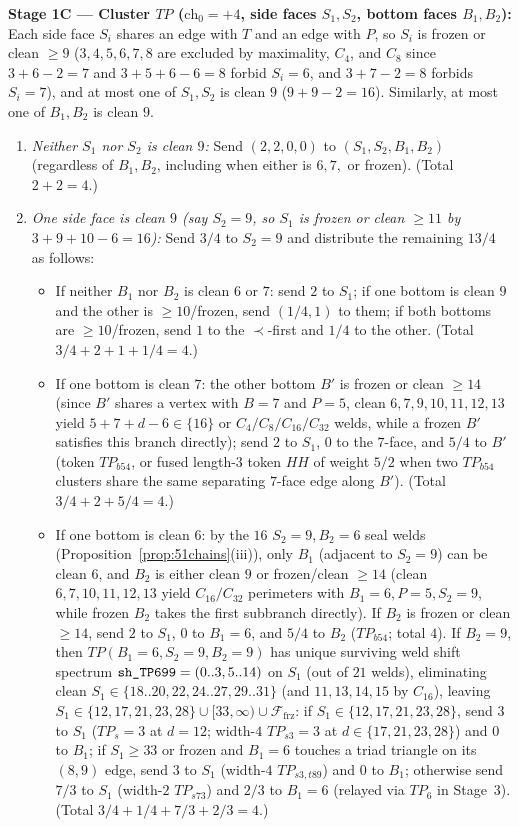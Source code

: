 \documentclass[11pt,reqno]{amsart}
\theoremstyle{plain}
\theoremstyle{definition}
\theoremstyle{remark}
\newcommand{\chz}{\mathrm{ch}_0}
\newcommand{\Ffrz}{\mathcal{F}_{\mathrm{frz}}}
\DeclareRobustCommand{\_}{\ifmmode\text{\textunderscore}\else\textunderscore\allowbreak\fi}
\begin{document}
\noindent\textbf{Stage 1C --- Cluster $TP$ ($\chz = +4$, side faces $S_1, S_2$, bottom faces $B_1, B_2$):}
Each side face $S_i$ shares an edge with $T$ and an edge with $P$, so $S_i$ is frozen or clean $\ge 9$ ($3, 4, 5, 6, 7, 8$ are excluded by maximality, $C_4$, and $C_8$ since $3+6-2=7$ and $3+5+6-6=8$ forbid $S_i=6$, and $3+7-2=8$ forbids $S_i=7$), and at most one of $S_1, S_2$ is clean $9$ ($9+9-2=16$). Similarly, at most one of $B_1, B_2$ is clean $9$.
\begin{enumerate}[label=(TP\arabic*),leftmargin=3.2em]
  \item \emph{Neither $S_1$ nor $S_2$ is clean $9$:} Send $(2, 2, 0, 0)$ to $(S_1, S_2, B_1, B_2)$ (regardless of $B_1, B_2$, including when either is $6, 7,$ or frozen). (Total $2 + 2 = 4$.)
  \item \emph{One side face is clean $9$ (say $S_2 = 9$, so $S_1$ is frozen or clean $\ge 11$ by $3+9+10-6=16$):} Send $3/4$ to $S_2 = 9$ and distribute the remaining $13/4$ as follows:
  \begin{itemize}[leftmargin=1.5em]
    \item If neither $B_1$ nor $B_2$ is clean $6$ or $7$: send $2$ to $S_1$; if one bottom is clean $9$ and the other is $\ge 10$/frozen, send $(1/4, 1)$ to them; if both bottoms are $\ge 10$/frozen, send $1$ to the $\prec$-first and $1/4$ to the other. (Total $3/4 + 2 + 1 + 1/4 = 4$.)
    \item If one bottom is clean $7$: the other bottom $B'$ is frozen or clean $\ge 14$ (since $B'$ shares a vertex with $B=7$ and $P=5$, clean $6, 7, 9, 10, 11, 12, 13$ yield $5+7+d-6 \in \{16\}$ or $C_4/C_8/C_{16}/C_{32}$ welds, while a frozen $B'$ satisfies this branch directly); send $2$ to $S_1$, $0$ to the $7$-face, and $5/4$ to $B'$ (token $TP_{b54}$, or fused length-$3$ token $HH$ of weight $5/2$ when two $TP_{b54}$ clusters share the same separating $7$-face edge along $B'$). (Total $3/4 + 2 + 5/4 = 4$.)
    \item If one bottom is clean $6$: by the $16$ $S_2=9, B_2=6$ seal welds (Proposition~\ref{prop:51chains}(iii)), only $B_1$ (adjacent to $S_2=9$) can be clean $6$, and $B_2$ is either clean $9$ or frozen/clean $\ge 14$ (clean $6, 7, 10, 11, 12, 13$ yield $C_{16}/C_{32}$ perimeters with $B_1=6, P=5, S_2=9$, while frozen $B_2$ takes the first subbranch directly). If $B_2$ is frozen or clean $\ge 14$, send $2$ to $S_1$, $0$ to $B_1 = 6$, and $5/4$ to $B_2$ ($TP_{b54}$; total $4$). If $B_2 = 9$, then $TP(B_1=6, S_2=9, B_2=9)$ has unique surviving weld shift spectrum $\texttt{sh\_TP699} = (0..3, 5..14)$ on $S_1$ (out of $21$ welds), eliminating clean $S_1 \in \{18..20, 22, 24..27, 29..31\}$ (and $11, 13, 14, 15$ by $C_{16}$), leaving $S_1 \in \{12, 17, 21, 23, 28\} \cup [33, \infty) \cup \Ffrz$: if $S_1 \in \{12, 17, 21, 23, 28\}$, send $3$ to $S_1$ ($TP_s=3$ at $d=12$; width-$4$ $TP_{s3}=3$ at $d \in \{17,21,23,28\}$) and $0$ to $B_1$; if $S_1 \ge 33$ or frozen and $B_1=6$ touches a triad triangle on its $(8,9)$ edge, send $3$ to $S_1$ (width-$4$ $TP_{s3,t89}$) and $0$ to $B_1$; otherwise send $7/3$ to $S_1$ (width-$2$ $TP_{s73}$) and $2/3$ to $B_1=6$ (relayed via $TP_6$ in Stage~3). (Total $3/4 + 1/4 + 7/3 + 2/3 = 4$.)

\end{itemize}
\end{enumerate}
\end{document}
